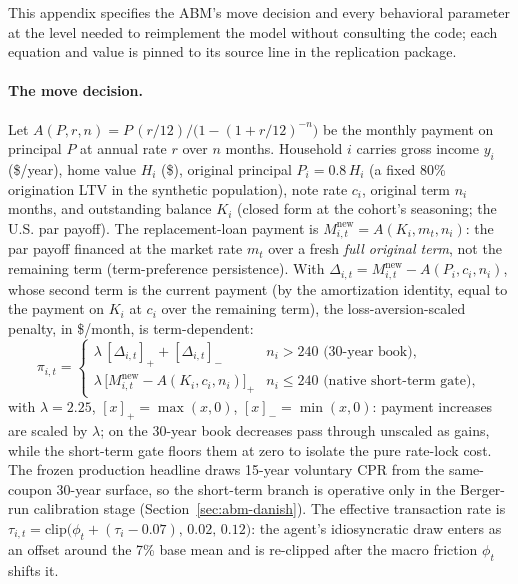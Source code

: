 \documentclass[12pt]{article}
\begin{document}
This appendix specifies the ABM's move decision and every behavioral parameter at the level needed to reimplement the model without consulting the code; each equation and value is pinned to its source line in the replication package.

\paragraph{The move decision.}
Let $A(P,r,n) = P\,(r/12)\big/\big(1-(1+r/12)^{-n}\big)$ be the monthly payment on principal $P$ at annual rate $r$ over $n$ months. %
Household $i$ carries gross income $y_i$ (\$/year), home value $H_i$ (\$), original principal $P_i = 0.8\,H_i$ (a fixed 80\% origination LTV in the synthetic population), note rate $c_i$, original term $n_i$ months, and outstanding balance $K_i$ (closed form at the cohort's seasoning; the U.S. par payoff). %
The replacement-loan payment is $M^{\mathrm{new}}_{i,t} = A(K_i, m_t, n_i)$: the par payoff financed at the market rate $m_t$ over a fresh \emph{full original term}, not the remaining term (term-preference persistence). %
With $\Delta_{i,t} = M^{\mathrm{new}}_{i,t} - A(P_i, c_i, n_i)$, whose second term is the current payment (by the amortization identity, equal to the payment on $K_i$ at $c_i$ over the remaining term), the loss-aversion-scaled penalty, in \$/month, is term-dependent:
\begin{equation}\label{eq:abmpenalty}
\pi_{i,t} =
\begin{cases}
\lambda\,[\Delta_{i,t}]_{+} + [\Delta_{i,t}]_{-} & n_i > 240 \text{ (30-year book)},\\
\lambda\,\big[M^{\mathrm{new}}_{i,t} - A(K_i, c_i, n_i)\big]_{+} & n_i \le 240 \text{ (native short-term gate)},
\end{cases}
\end{equation}
with $\lambda = 2.25$, $[x]_{+} = \max(x,0)$, $[x]_{-} = \min(x,0)$: payment increases are scaled by $\lambda$; on the 30-year book decreases pass through unscaled as gains, while the short-term gate floors them at zero to isolate the pure rate-lock cost. The frozen production headline draws 15-year voluntary CPR from the same-coupon 30-year surface, so the short-term branch is operative only in the Berger-run calibration stage (Section~\ref{sec:abm-danish}).
The effective transaction rate is $\tau_{i,t} = \mathrm{clip}\big(\phi_t + (\tau_i - 0.07),\,0.02,\,0.12\big)$: the agent's idiosyncratic draw enters as an offset around the 7\% base mean and is re-clipped after the macro friction $\phi_t$ shifts it. %
\end{document}
